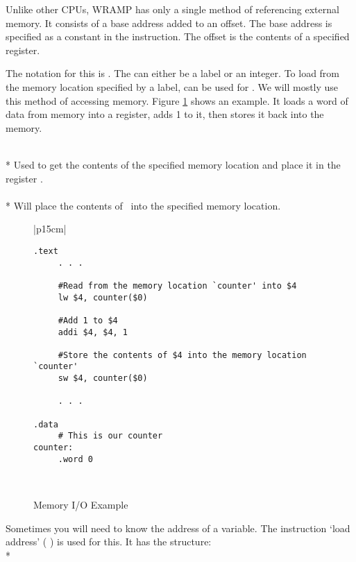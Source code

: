 Unlike other CPUs, WRAMP has only a single method of referencing
external memory. It consists of a base address added to an offset.
The base address is specified as a constant in the instruction. The
offset is the contents of a specified register.

The notation for this is . The  can either
be a label or an integer. To load from the memory location specified
by a label,  can be used for \regs. We will mostly use this method
of accessing memory. Figure \ref{memio} shows an example.
It loads a word of data from memory into a register, adds 1 to it,
then stores it back into the memory.

\\*
Used to get the contents of the specified memory location and place it 
in the register \regd.
\\

\\*
Will place the contents of \regd\ into the specified memory location.
\\

\begin{figure}[btp]
\begin{center}
\begin{tabular}{|p{15cm}|}
\hline
\begin{verbatim}
.text
     . . .

     #Read from the memory location `counter' into $4
     lw $4, counter($0)

     #Add 1 to $4
     addi $4, $4, 1

     #Store the contents of $4 into the memory location `counter'
     sw $4, counter($0)

     . . .
     
.data
     # This is our counter
counter:
     .word 0 
\end{verbatim}%
\\
\hline
\end{tabular}
\end{center}
\caption{Memory I/O Example}
\label{memio}
\end{figure}

Sometimes you will need to know the address of a variable. The 
instruction `load address' (  ) is used for this. It has the 
structure:
\\*

